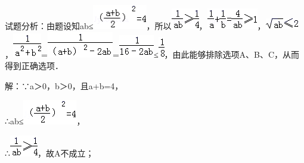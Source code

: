 \documentclass[
]{article}
\begin{document}
试题分析：由题设知ab≤\includegraphics[width=0.92746in,height=0.42726in]{Fig//media/image850.png}，所以\includegraphics[width=0.47936in,height=0.36473in]{Fig//media/image851.png}，\includegraphics[width=0.87535in,height=0.36473in]{Fig//media/image852.png}，\includegraphics[width=0.56273in,height=0.18758in]{Fig//media/image853.png}，\includegraphics[width=0.48978in,height=0.42726in]{Fig//media/image854.png}=\includegraphics[width=1.13588in,height=0.4481in]{Fig//media/image855.png}=\includegraphics[width=0.60441in,height=0.39599in]{Fig//media/image856.png}≤\includegraphics[width=0.10421in,height=0.36473in]{Fig//media/image857.png}，由此能够排除选项A、B、C，从而得到正确选项．

解：∵a＞0，b＞0，且a+b=4，

∴ab≤\includegraphics[width=0.92746in,height=0.42726in]{Fig//media/image858.png}，

∴\includegraphics[width=0.47936in,height=0.36473in]{Fig//media/image859.png}，故A不成立；
\end{document}
